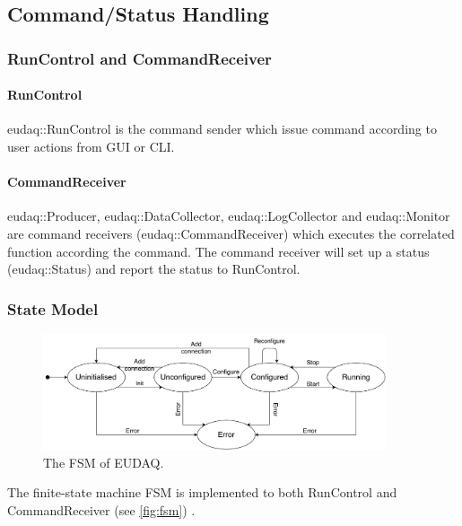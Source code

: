 \subsection{Command/Status Handling}
\subsubsection{RunControl and CommandReceiver}\label{sec:fsm}
\paragraph{RunControl} eudaq::RunControl is the command sender which issue command according to user actions from GUI or CLI.
\paragraph{CommandReceiver} eudaq::Producer, eudaq::DataCollector, eudaq::LogCollector and eudaq::Monitor are command receivers (eudaq::CommandReceiver) which executes the correlated function according the command. The command receiver will set up a status (eudaq::Status) and report the status to RunControl.

\subsubsection{State Model}\label{sec:fsm}
\begin{figure}
\begin{center}
\includegraphics[width=0.9\textwidth]{src/images/fsmv2.pdf}
\end{center}
\caption{The FSM of EUDAQ.}
\label{fig:fsm}
\end{figure}

The finite-state machine \gls{FSM} is implemented to both RunControl and CommandReceiver (see \autoref{fig:fsm}) \cite{Shirokova:2016}. \\

